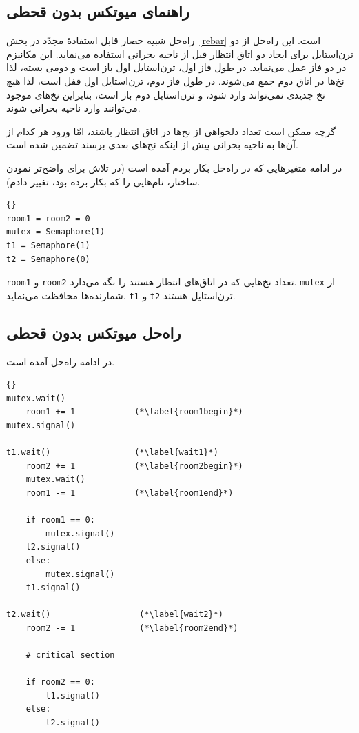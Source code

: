 \documentclass{book}
\newcommand{\clearemptydoublepage}{\newpage\cleardoublepage}
\begin{document}
\clearemptydoublepage
\subsection{راهنمای میوتکس بدون قحطی}
\label{morris}

    راه‌حل  شبیه حصار قابل استفادهٔ مجدّد در بخش~\ref{rebar} است. 
    این راه‌حل از دو ترن‌استایل برای ایجاد دو اتاق انتظار قبل از ناحیه بحرانی استفاده می‌نماید. این مکانیزم در دو فاز عمل می‌نماید. 
    در طول فاز اول، ترن‌استایل اول باز است و دومی بسته، لذا نخ‌ها در اتاق دوم جمع می‌شوند. در طول فاز دوم، ترن‌استایل اول قفل است، لذا هیچ 
    نخ جدیدی نمی‌تواند وارد شود، و ترن‌استایل دوم باز است، بنابراین نخ‌های موجود می‌توانند وارد ناحیه بحرانی شوند. 

    گرچه ممکن است تعداد دلخواهی از نخ‌ها در اتاق انتظار باشند، امّا  ورود هر کدام از آن‌ها به ناحیه بحرانی پیش از اینکه نخ‌های بعدی برسند تضمین شده است. 

    در ادامه متغیرهایی که در راه‌حل بکار بردم آمده است (در تلاش برای واضح‌تر نمودن ساختار، نام‌هایی را که  بکار برده بود، تغییر دادم). 

\begin{latin}
\begin{lstlisting}[title=\rl{راهنمایی میوتکس بدون قحطی}]{}
room1 = room2 = 0
mutex = Semaphore(1)
t1 = Semaphore(1)
t2 = Semaphore(0)
\end{lstlisting}
\end{latin}

    {\tt room1} و  {\tt room2} 
    تعداد نخ‌هایی که در اتاق‌های انتظار هستند را نگه می‌دارد. {\tt mutex} از شمارنده‌ها محافظت می‌نماید. {\tt t1} و {\tt t2}
    ترن‌استایل هستند. 
    


\clearemptydoublepage
\subsection{راه‌حل میوتکس بدون قحطی}

    در ادامه راه‌حل  آمده است. 

\begin{latin}
\begin{lstlisting}[title=\rl{الگوریتم  \lr{Morris}}]{}
mutex.wait()
    room1 += 1            (*\label{room1begin}*)
mutex.signal()
                           
t1.wait()                 (*\label{wait1}*)
    room2 += 1            (*\label{room2begin}*)
    mutex.wait()
    room1 -= 1            (*\label{room1end}*)

    if room1 == 0: 
        mutex.signal()
	t2.signal()
    else: 
        mutex.signal()
	t1.signal()

t2.wait()                  (*\label{wait2}*)
    room2 -= 1             (*\label{room2end}*)

    # critical section

    if room2 == 0:
        t1.signal()
    else:
        t2.signal()
\end{lstlisting}
\end{latin}
\end{document}
